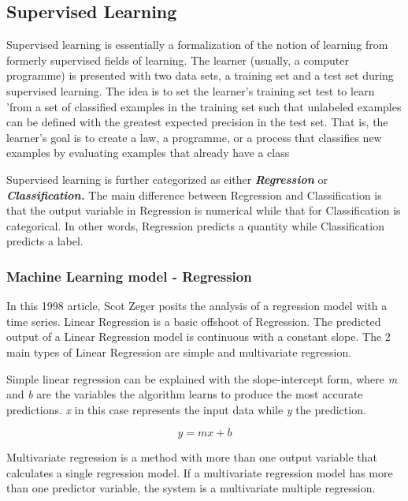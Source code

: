 \subsection{Supervised Learning}
Supervised learning is essentially a formalization of the notion of learning from formerly supervised fields of learning. The learner (usually, a computer programme) is presented with two data sets, a training set and a test set during supervised learning. The idea is to set the learner's training set test to learn 'from a set of classified examples in the training set such that unlabeled examples can be defined with the greatest expected precision in the test set. That is, the learner's goal is to create a law, a programme, or a process that classifies new examples by evaluating examples that already have a class \cite{learned2014introduction}

Supervised learning is further categorized as  either \textbf{\textit{Regression}} or \textbf{\textit{Classification.}} The main difference between Regression and Classification is that the output variable in Regression is numerical while that for Classification is categorical. In other words, Regression predicts a quantity while  Classification predicts a label.


\subsubsection{Machine Learning model - Regression}
In this 1998 article, \cite{zeger1988regression} Scot Zeger posits the analysis of a regression model with a time series. Linear Regression is a basic offshoot of Regression. The predicted output of a Linear Regression model is continuous with a constant slope. The 2 main types of Linear Regression are simple and multivariate regression. 

Simple linear regression can be explained with the slope-intercept form, where \textit{m} and \textit{b} are the variables the algorithm learns to produce the most accurate predictions. \textit{x} in this case represents the input data while \textit{y} the prediction.

\begin{equation}
	y = m x + b
\end{equation}

Multivariate regression is a method with more than one output variable that calculates a single regression model. If a multivariate regression model has more than one predictor variable, the system is a multivariate multiple regression.


